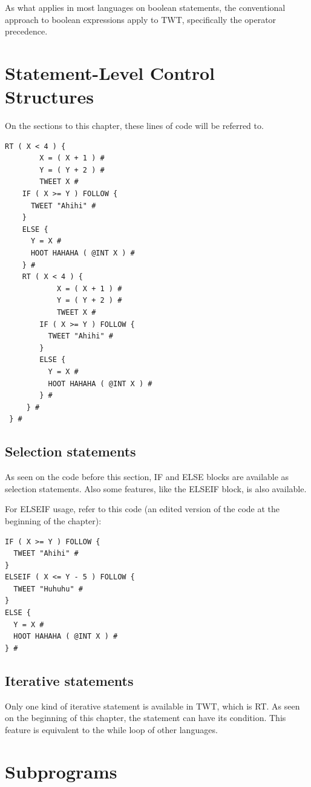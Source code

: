 \documentclass[11pt,a4paper]{report}
\begin{document}
As what applies in most languages on boolean statements, the conventional
approach to boolean expressions apply to TWT, specifically the operator
precedence.

\chapter{Statement-Level Control Structures}

On the sections to this chapter, these lines of code will be referred to.

\begin{lstlisting}
RT ( X < 4 ) {
		X = ( X + 1 ) #
		Y = ( Y + 2 ) #
		TWEET X #
    IF ( X >= Y ) FOLLOW {
      TWEET "Ahihi" #
    }
    ELSE {
      Y = X #
      HOOT HAHAHA ( @INT X ) #
    } #
    RT ( X < 4 ) {
    		X = ( X + 1 ) #
    		Y = ( Y + 2 ) #
    		TWEET X #
        IF ( X >= Y ) FOLLOW {
          TWEET "Ahihi" #
        }
        ELSE {
          Y = X #
          HOOT HAHAHA ( @INT X ) #
        } #
     } #
 } #
\end{lstlisting}

\section{Selection statements}

As seen on the code before this section, IF and ELSE blocks are available as
selection statements. Also some features, like the
ELSEIF block, is also available.

For ELSEIF usage, refer to this code (an edited version of the code at the
beginning of the chapter):

\begin{lstlisting}
IF ( X >= Y ) FOLLOW {
  TWEET "Ahihi" #
}
ELSEIF ( X <= Y - 5 ) FOLLOW {
  TWEET "Huhuhu" #
}
ELSE {
  Y = X #
  HOOT HAHAHA ( @INT X ) #
} #
\end{lstlisting}

\section{Iterative statements}

Only one kind of iterative statement is available in TWT, which is RT. As seen
on the beginning of this chapter, the statement can have its condition. This
feature is equivalent to the while loop of other languages.

\chapter{Subprograms}
\end{document}

